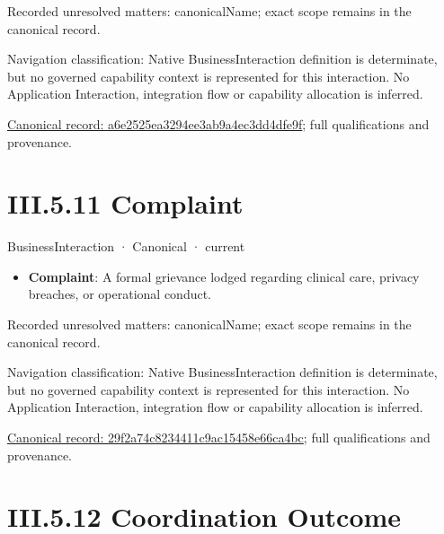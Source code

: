 {\small Recorded unresolved matters: canonicalName; exact scope remains in the canonical record.}\par
{\small Navigation classification: Native BusinessInteraction definition is determinate, but no governed capability context is represented for this interaction. No Application Interaction, integration flow or capability allocation is inferred.}\par
{\footnotesize \href{../../../../continuum/business/business-interaction/a6e2525ea3294ee3ab9a4ec3dd4dfe9f.md}{Canonical record: a6e2525ea3294ee3ab9a4ec3dd4dfe9f}; full qualifications and provenance.}\par
\section*{III.5.11 Complaint}
\label{navigation:III.5.11}

\label{element:29f2a74c8234411c9ac15458e66ca4bc}
{\small BusinessInteraction · Canonical · current}\par

\begin{itemize}


\item \textbf{Complaint}: A formal grievance lodged regarding clinical care, privacy breaches, or operational conduct.

\end{itemize}

{\small Recorded unresolved matters: canonicalName; exact scope remains in the canonical record.}\par
{\small Navigation classification: Native BusinessInteraction definition is determinate, but no governed capability context is represented for this interaction. No Application Interaction, integration flow or capability allocation is inferred.}\par
{\footnotesize \href{../../../../continuum/business/business-interaction/29f2a74c8234411c9ac15458e66ca4bc.md}{Canonical record: 29f2a74c8234411c9ac15458e66ca4bc}; full qualifications and provenance.}\par
\section*{III.5.12 Coordination Outcome}
\label{navigation:III.5.12}

